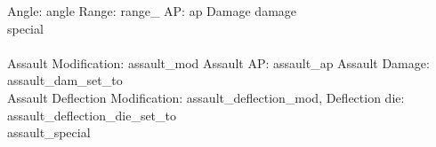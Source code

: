 \indent Angle: {angle} Range: {range_}  AP: {ap} Damage {damage} \\
{special} \\
\ \\
Assault Modification: {assault_mod} Assault AP: {assault_ap} Assault Damage: {assault_dam_set_to}\\
Assault Deflection Modification: {assault_deflection_mod}, Deflection die: {assault_deflection_die_set_to} \\
{assault_special}


